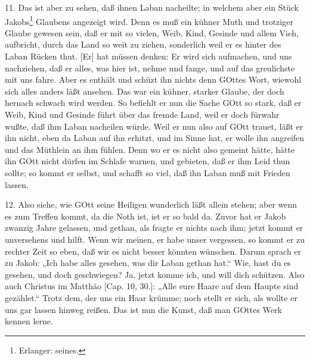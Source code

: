 11. Das ist aber zu sehen, daß ihnen Laban nacheilte; in welchem aber ein Stück Jakobs\footnote{Erlanger: seines.} Glaubens angezeigt wird. Denn es muß ein kühner Muth und trotziger Glaube gewesen sein, daß er mit so vielen, Weib, Kind, Gesinde und allem Vieh, aufbricht, durch das Land so weit zu ziehen, sonderlich weil er es hinter des Laban Rücken thut. [Er] hat müssen denken: Er wird sich aufmachen, und uns nachziehen, daß er alles, was hier ist, nehme und fange, und auf das greulichste mit uns fahre. Aber es enthält und schüzt ihn nichts denn GOttes Wort, wiewohl sich alles anders läßt ansehen. Das war ein kühner, starker Glaube, der doch hernach schwach wird werden. So befiehlt er nun die Sache GOtt so stark, daß er Weib, Kind und Gesinde führt über das fremde Land, weil er doch fürwahr wußte, daß ihm Laban nacheilen würde. Weil er nun also auf GOtt trauet, läßt er ihn nicht, eben da Laban auf ihn erhitzt, und im Sinne hat, er wolle ihn angreifen und das Müthlein an ihm fühlen. Denn wo er es nicht also gemeint hätte, hätte ihn GOtt nicht dürfen im Schlafe warnen, und gebieten, daß er ihm Leid thun sollte; so kommt er selbst, und schafft so viel, daß ihn Laban muß mit Frieden lassen.

12. Also siehe, wie GOtt seine Heiligen wunderlich läßt allein stehen; aber wenn es zum
Treffen kommt, da die Noth ist, ist er so bald da. Zuvor hat er Jakob zwanzig Jahre gelassen, und gethan, als fragte er nichts nach ihm; jetzt kommt er unversehens und hilft. Wenn wir meinen, er habe unser vergessen, so kommt er zu rechter Zeit so eben, daß wir es nicht besser könnten wünschen. Darum sprach er zu Jakob: „Ich habe alles gesehen, was dir Laban gethan hat.“ Wie, hast du es gesehen, und doch geschwiegen? Ja, jetzt komme ich, und will dich schützen. Also auch Christus im Matthäo [Cap. 10, 30.]: „Alle eure Haare auf dem Haupte sind gezählet.“ Trotz dem, der uns ein Haar krümme; noch stellt er sich, als wollte er uns gar lassen hinweg reißen. Das ist nun die Kunst, daß man GOttes Werk kennen lerne.

